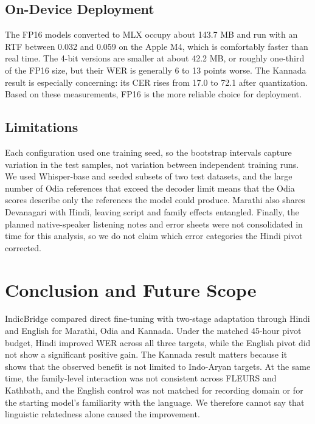 \documentclass[conference]{IEEEtran}
\begin{document}
\subsection{On-Device Deployment}

The FP16 models converted to MLX occupy about 143.7 MB and run with an
RTF between 0.032 and 0.059 on the Apple M4, which is comfortably faster
than real time. The 4-bit versions are smaller at about
42.2 MB, or roughly one-third of the FP16 size, but their WER is generally
6 to 13 points worse. The Kannada result is especially concerning:
its CER rises from 17.0 to 72.1 after quantization. Based on these
measurements, FP16 is the more reliable choice for deployment.



\subsection{Limitations}

Each configuration used one training seed, so the bootstrap intervals
capture variation in the test samples, not variation between independent
training runs. We used Whisper-base and seeded subsets of two test
datasets, and the large number of Odia references that exceed the
decoder limit means that the Odia scores describe only the references
the model could produce. Marathi also shares Devanagari with Hindi, leaving
script and family effects entangled. Finally, the planned native-speaker
listening notes and error sheets were not consolidated in time for this
analysis, so we do not claim which error categories the Hindi pivot
corrected.

\section{Conclusion and Future Scope}

IndicBridge compared direct fine-tuning with two-stage adaptation
through Hindi and English for Marathi, Odia and Kannada. Under the
matched 45-hour pivot budget, Hindi improved WER across all three
targets, while the English pivot did not show a significant positive
gain. The Kannada result matters because it shows that the observed
benefit is not limited to Indo-Aryan targets. At the same time, the
family-level interaction was not consistent across FLEURS and
Kathbath, and the English control was not matched for recording domain
or for the starting model's familiarity with the language. We therefore
cannot say that linguistic relatedness alone caused the improvement.
\end{document}
